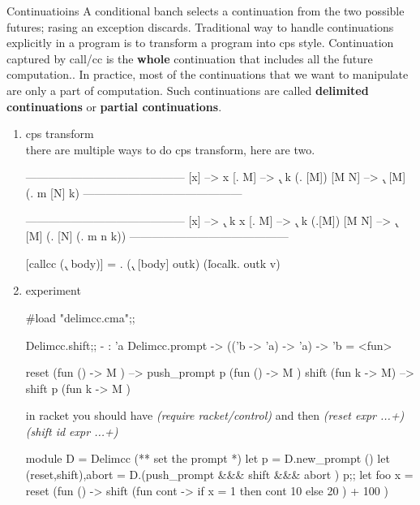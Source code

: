 Continuatioins
A conditional banch selects a continuation from the two possible
futures; rasing an exception discards. Traditional way to handle
continuations explicitly in a program is to transform a program into
cps style. Continuation captured by call/cc is the {\bf whole} continuation
that includes all the future computation.. In practice, most of the
continuations that we want to manipulate are only a part of
computation. Such continuations are called {\bf delimited continuations} or
{\bf partial continuations}.


\begin{enumerate}
\item cps transform \\
  there are multiple ways to do cps transform, here are two.

  
  \begin{bluetext}
------------------------------------------
   [x] --> x
   [\x. M] --> \k . k (\x . [M])
   [M N] --> \k. [M] (\m . m [N] k)
------------------------------------------


------------------------------------------
   [x] --> \k . k x
   [\x. M] --> \k. k (\x.[M])
   [M N] --> \k. [M] (\m . [N] (\n. m n k))
------------------------------------------


[callcc (\k. body)] = \outk. (\k. [body] outk) (\v localk. outk v)
   
  \end{bluetext}

  
\item experiment

\begin{alternate}
#load "delimcc.cma";;
\end{alternate}
\begin{alternate}
Delimcc.shift;;
- : 'a Delimcc.prompt -> (('b -> 'a) -> 'a) -> 'b = <fun>
\end{alternate}

\begin{bluetext}
reset (fun () -> M ) --> push_prompt p (fun () -> M )
shift (fun k -> M) --> shift p (fun k -> M )
\end{bluetext}
in racket you should have \textit{(require racket/control)}
and then \textit{(reset expr ...+)}
\textit{(shift id expr ...+)}


\begin{ocamlcode}
module D = Delimcc
(** set the prompt *)  
let p = D.new_prompt ()
let (reset,shift),abort  = D.(push_prompt &&& shift &&& abort ) p;;
let foo x = reset (fun () -> shift (fun cont -> if x = 1 then cont 10 else 20 ) + 100 )
\end{ocamlcode}


\end{enumerate}
